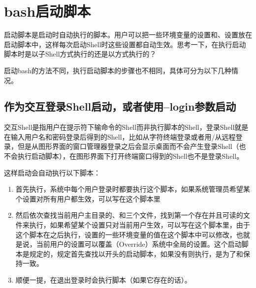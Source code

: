 
\section{bash启动脚本}
%
启动脚本是启动时自动执行的脚本。用户可以把一些环境变量的设置和、设置放在启动脚本中，这样每次启动Shell时这些设置都自动生效。思考一下，在执行启动脚本时是以子Shell方式执行的还是以方式执行的？



启动bash的方法不同，执行启动脚本的步骤也不相同，具体可分为以下几种情况。


\subsection{作为交互登录Shell启动，或者使用--login参数启动}
%


交互Shell是指用户在提示符下输命令的Shell而非执行脚本的Shell，登录Shell就是在输入用户名和密码登录后得到的Shell，比如从字符终端登录或者用/从远程登录，但是从图形界面的窗口管理器登录之后会显示桌面而不会产生登录Shell（也不会执行启动脚本），在图形界面下打开终端窗口得到的Shell也不是登录Shell。



这样启动会自动执行以下脚本：


\begin{enumerate}

\item 首先执行，系统中每个用户登录时都要执行这个脚本，如果系统管理员希望某个设置对所有用户都生效，可以写在这个脚本里

\item 然后依次查找当前用户主目录的、和三个文件，找到第一个存在并且可读的文件来执行，如果希望某个设置只对当前用户生效，可以写在这个脚本里，由于这个脚本在之后执行，设置的一些环境变量的值在这个脚本中可以修改，也就是说，当前用户的设置可以覆盖（Override）系统中全局的设置。这个启动脚本是规定的，规定首先查找以开头的启动脚本，如果没有则执行，是为了和保持一致。

\item 顺便一提，在退出登录时会执行脚本（如果它存在的话）。
\end{enumerate}

